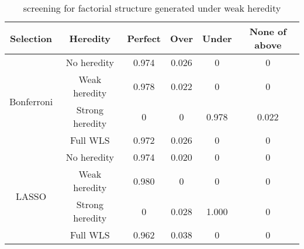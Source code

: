 \documentclass[12pt]{article}
\begin{document}
\begin{table}[ht]
\centering
\caption{ screening for factorial structure generated under weak heredity}
\label{tab:weak-ms}
\begin{tabular}{cccccc}
\toprule
Selection                   & Heredity        & Perfect  & Over  & Under  & None of above \\ \hline
\multirow{4}{*}{Bonferroni} & No heredity     & 0.974             & 0.026          & 0               & 0             \\ \cline{2-6} 
                            & Weak heredity   & 0.978             & 0.022          & 0               & 0             \\ \cline{2-6} 
                            & Strong heredity & 0                 & 0              & 0.978           & 0.022         \\ \cline{2-6} 
                            & Full WLS        & 0.972             & 0.026          & 0               & 0             \\ \hline
\multirow{4}{*}{LASSO}      & No heredity     & 0.974             & 0.020          & 0               & 0             \\ \cline{2-6} 
                            & Weak heredity   & 0.980             & 0              & 0               & 0             \\ \cline{2-6} 
                            & Strong heredity & 0                 & 0.028          & 1.000           & 0             \\ \cline{2-6} 
                            & Full WLS        & 0.962             & 0.038          & 0               & 0             \\ \bottomrule
\end{tabular}
\end{table}
\end{document}
